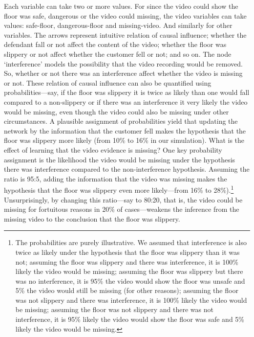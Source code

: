 \documentclass[
  10pt,
  dvipsnames,enabledeprecatedfontcommands]{scrartcl}
\begin{document}
Each variable can take two or more values. For since the video could
show the floor was safe, dangerous or the video could missing, the video
variables can take values: safe-floor, dangerous-floor and
missing-video. And similarly for other variables. The arrows represent
intuitive relation of causal influence; whether the defendant fall or
not affect the content of the video; whether the floor was slippery or
not affect whether the customer fell or not; and so on. The node
`interference' models the possibility that the video recording would be
removed. So, whether or not there was an interference affect whether the
video is missing or not. These relation of causal influence can also be
quantified using probabilities---say, if the floor was slippery it is
twice as likely than one would fall compared to a non-slippery or if
there was an interference it very likely the video would be missing,
even though the video could also be missing under other circumstances. A
plausible assignment of probabilities yield that updating the network by
the information that the customer fell makes the hypothesis that the
floor was slippery more likely (from 10\% to 16\% in our simulation).
What is the effect of learning that the video evidence is missing? One
key probability assignment is the likelihood the video would be missing
under the hypothesis there was interference compared to the
non-interference hypothesis. Assuming the ratio is 95:5, adding the
information that the video was missing makes the hypothesis that the
floor was slippery even more likely---from 16\% to 28\%).\footnote{The
  probabilities are purely illustrative. We assumed that interference is
  also twice as likely under the hypothesis that the floor was slippery
  than it was not; assuming the floor was slippery and there was
  interference, it is 100\% likely the video would be missing; assuming
  the floor was slippery but there was no interference, it is 95\% the
  video would show the floor was unsafe and 5\% the video would still be
  missing (for other reasons); assuming the floor was not slippery and
  there was interference, it is 100\% likely the video would be missing;
  assuming the floor was not slippery and there was not interference, it
  is 95\% likely the video would show the floor was safe and 5\% likely
  the video would be missing.} Unsurprisingly, by changing this
ratio---say to 80:20, that is, the video could be missing for fortuitous
reasons in 20\% of cases---weakens the inference from the missing video
to the conclusion that the floor was slippery.
\end{document}
